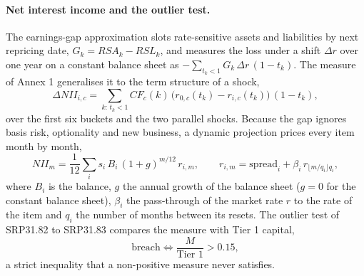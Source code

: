\paragraph{Net interest income and the outlier test.}
The earnings-gap approximation slots rate-sensitive assets and liabilities by next repricing date, $G_k=RSA_k-RSL_k$, and measures the loss under a shift $\Delta r$ over one year on a constant balance sheet as $-\sum_{t_k<1}G_k\,\Delta r\,(1-t_k)$. The measure of Annex 1 generalises it to the term structure of a shock,
\begin{equation}
\Delta NII_{i,c}=\sum_{k:\,t_k<1}CF_c(k)\,\big(r_{0,c}(t_k)-r_{i,c}(t_k)\big)\,(1-t_k),
\label{eq:alm-nii}
\end{equation}
over the first six buckets and the two parallel shocks. Because the gap ignores basis risk, optionality and new business, a dynamic projection prices every item month by month,
\begin{equation}
NII_m=\frac{1}{12}\sum_{i}s_i\,B_i\,(1+g)^{m/12}\,r_{i,m},\qquad r_{i,m}=\text{spread}_i+\beta_i\,r_{\lfloor m/q_i\rfloor q_i},
\label{eq:alm-dynamic}
\end{equation}
where $B_i$ is the balance, $g$ the annual growth of the balance sheet ($g=0$ for the constant balance sheet), $\beta_i$ the pass-through of the market rate $r$ to the rate of the item and $q_i$ the number of months between its resets. The outlier test of SRP31.82 to SRP31.83 compares the measure with Tier 1 capital,
\begin{equation}
\text{breach}\iff \frac{M}{\text{Tier 1}}>0.15,
\label{eq:alm-outlier}
\end{equation}
a strict inequality that a non-positive measure never satisfies.


